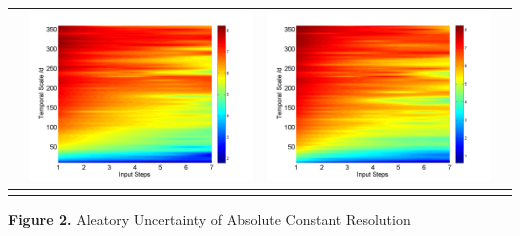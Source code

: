 \documentclass[draft,wrr]{AGUTeX}
\begin{document}
\begin{article}
\begin{table}[H]
\begin{tabular}{cccc}
&\begin{minipage}{.3\textwidth}\includegraphics[width=\linewidth]{resultgraph/06810000pep_abs.png}\end{minipage}
&\begin{minipage}{.3\textwidth}\includegraphics[width=\linewidth]{resultgraph/06810000pepq_abs.png}\end{minipage}
\\
\hline
\\
\end{tabular}

\Large{\textbf{Figure 2.} Aleatory Uncertainty of Absolute Constant Resolution}
\end{table}


\end{article}
\end{document}
